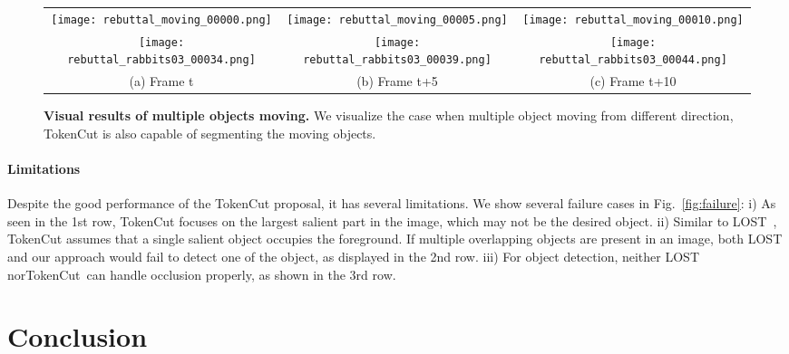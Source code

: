 \documentclass[twocolumn]{article}
\newcommand{\name} {TokenCut}
\begin{document}
\begin{figure}[ht!]
    \centering
    \begin{tabular}{c@{\hskip 1.3pt}c@{\hskip 1.3pt}c}
        \texttt{[image: rebuttal\_moving\_00000.png]} &
        \texttt{[image: rebuttal\_moving\_00005.png]} &
        \texttt{[image: rebuttal\_moving\_00010.png]}\\
        \texttt{[image: rebuttal\_rabbits03\_00034.png]} &
        \texttt{[image: rebuttal\_rabbits03\_00039.png]} &
        \texttt{[image: rebuttal\_rabbits03\_00044.png]} \\
        (a) Frame t & (b) Frame t+5 & (c) Frame t+10\\
    \end{tabular}
    \caption{\textbf{Visual results of multiple objects moving.} We visualize the case when multiple object moving from different direction, TokenCut is also capable of segmenting the moving objects.}
    \label{fig: moving}
\end{figure}


\paragraph*{Limitations} 
Despite the good performance of the {\name} proposal, it has several limitations. We show several failure cases in Fig.~\ref{fig:failure}:
i) As seen in the 1st row, {\name} focuses on the largest salient part in the image, which may not be the desired object.
ii) Similar to 
LOST~\cite{simeoni2021localizing}, {\name} assumes that a single salient object occupies the foreground. If multiple overlapping objects are present in an image, both LOST and our approach would fail to detect one of the object, as displayed in the 2nd row. 
iii) For object detection, neither LOST nor\name~can handle occlusion properly, as shown in the 3rd row.  



\section{Conclusion}
\end{document}
